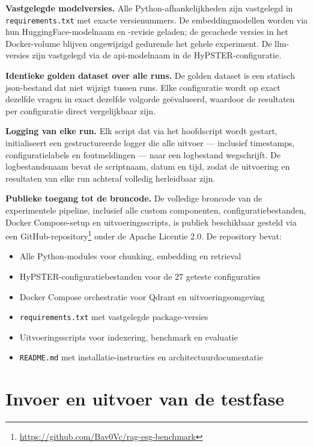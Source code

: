 \textbf{Vastgelegde modelversies.} Alle Python-afhankelijkheden zijn vastgelegd in \texttt{requirements.txt} met exacte versienummers. De embeddingmodellen worden via hun HuggingFace-modelnaam en -revisie geladen; de gecachede versies in het Docker-volume blijven ongewijzigd gedurende het gehele experiment. De \gls{llm}-versies zijn vastgelegd via de \gls{api}-modelnaam in de HyPSTER-configuratie.

\textbf{Identieke golden dataset over alle runs.} De golden dataset is een statisch \gls{json}-bestand dat niet wijzigt tussen runs. Elke configuratie wordt op exact dezelfde vragen in exact dezelfde volgorde geëvalueerd, waardoor de resultaten per configuratie direct vergelijkbaar zijn.

\textbf{Logging van elke run.} Elk script dat via het hoofdscript wordt gestart, initialiseert een gestructureerde logger die alle uitvoer — inclusief timestamps, configuratielabels en foutmeldingen — naar een logbestand wegschrijft. De logbestandsnaam bevat de scriptnaam, datum en tijd, zodat de uitvoering en resultaten van elke run achteraf volledig herleidbaar zijn.

\textbf{Publieke toegang tot de broncode.} De volledige broncode van de experimentele pipeline, inclusief alle custom componenten, configuratiebestanden, Docker Compose-setup en uitvoeringsscripts, is publiek beschikbaar gesteld via een GitHub-repository\footnote{\url{https://github.com/Bav0Vc/rag-esg-benchmark}} onder de Apache Licentie 2.0. De repository bevat:

\begin{itemize}
    \item Alle Python-modules voor chunking, embedding en retrieval
    \item HyPSTER-configuratiebestanden voor de 27 geteste configuraties
    \item Docker Compose orchestratie voor Qdrant en uitvoeringsomgeving
    \item \texttt{requirements.txt} met vastgelegde package-versies
    \item Uitvoeringsscripts voor indexering, benchmark en evaluatie
    \item \texttt{README.md} met installatie-instructies en architectuurdocumentatie
\end{itemize}

\section{Invoer en uitvoer van de testfase}
\label{sec:invoer-uitvoer}

